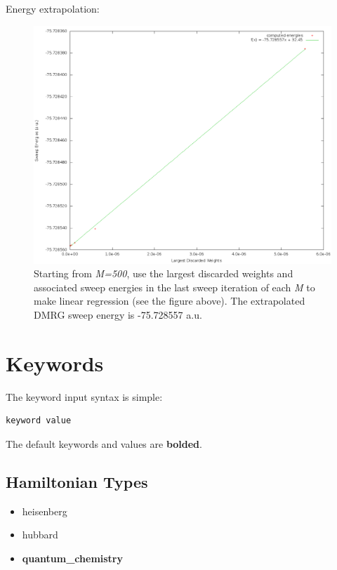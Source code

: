 \documentclass[letterpaper,10pt,english]{sphinxmanual}
\begin{document}
Energy extrapolation:
\begin{figure}[htbp]\begin{flushleft}
\capstart

\includegraphics{c2_energy.png}
\caption{Starting from \emph{M=500}, use the largest discarded weights and associated sweep energies in the last sweep iteration of each \emph{M} to make linear regression (see the figure above).
The extrapolated DMRG sweep energy is -75.728557 a.u.}\end{flushleft}\end{figure}


\section{Keywords}
\label{keywords:keywords}\label{keywords::doc}
The keyword input syntax is simple:

\begin{Verbatim}[commandchars=\\\{\}]
keyword value
\end{Verbatim}

The default keywords and values are \textbf{bolded}.


\subsection{Hamiltonian Types}
\label{keywords:hamiltonian-types}\begin{itemize}
\item {} 
heisenberg

\item {} 
hubbard

\item {} 
\textbf{quantum\_chemistry}

\end{itemize}
\end{document}

